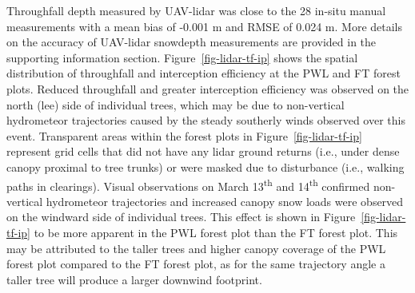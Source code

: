\documentclass[
  letterpaper,
  DIV=11,
  numbers=noendperiod]{scrartcl}
\begin{document}
Throughfall depth measured by UAV-lidar was close to the 28 in-situ
manual measurements with a mean bias of -0.001 m and RMSE of 0.024 m.
More details on the accuracy of UAV-lidar snowdepth measurements are
provided in the supporting information section.
Figure~\ref{fig-lidar-tf-ip} shows the spatial distribution of
throughfall and interception efficiency at the PWL and FT forest plots.
Reduced throughfall and greater interception efficiency was observed on
the north (lee) side of individual trees, which may be due to
non-vertical hydrometeor trajectories caused by the steady southerly
winds observed over this event. Transparent areas within the forest
plots in Figure~\ref{fig-lidar-tf-ip} represent grid cells that did not
have any lidar ground returns (i.e., under dense canopy proximal to tree
trunks) or were masked due to disturbance (i.e., walking paths in
clearings). Visual observations on March 13\textsuperscript{th} and
14\textsuperscript{th} confirmed non-vertical hydrometeor trajectories
and increased canopy snow loads were observed on the windward side of
individual trees. This effect is shown in Figure~\ref{fig-lidar-tf-ip}
to be more apparent in the PWL forest plot than the FT forest plot. This
may be attributed to the taller trees and higher canopy coverage of the
PWL forest plot compared to the FT forest plot, as for the same
trajectory angle a taller tree will produce a larger downwind footprint.
\end{document}
